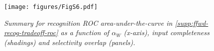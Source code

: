 \begin{figure}[H]
    \centering
    \texttt{[image: figures/FigS6.pdf]}
    \caption{
    \it{Summary for recognition ROC area-under-the-curve in \autoref{supp:ffwd-recog-tradeoff-roc} as a function of $\alpha_W$ (x-axis), input completeness (shadings) and selectivity overlap (panels).
    }}
    \label{supp:ffwd-recog-ROCAUC}
\end{figure}

